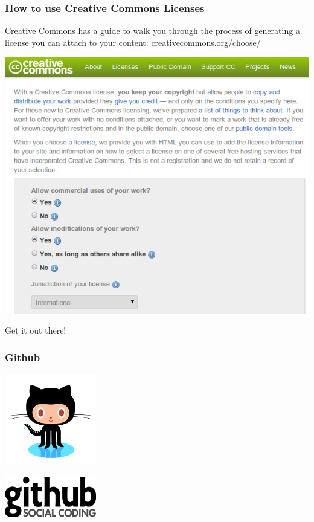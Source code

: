\documentclass{beamer}
\begin{document}
\begin{frame}
  \frametitle{How to use Creative Commons Licenses}

  Creative Commons has a guide to walk you through the process of generating a license you can attach to your content: \href{http://creativecommons.org/choose/}{creativecommons.org/choose/}

  \begin{center}
    \includegraphics[height=0.7\textheight]{../img/cc-guide-short}
  \end{center}
  
\end{frame}



\begin{frame}
  \begin{center} \begin{Huge}Get it out there!\end{Huge} \end{center}
\end{frame}

\begin{frame}
  \frametitle{Github}
  \begin{center}
    \includegraphics[width=0.3\textwidth]{../img/octocat}

    \includegraphics[width=0.3\textwidth]{../img/github-logo}
  \end{center}
\end{frame}
\end{document}
